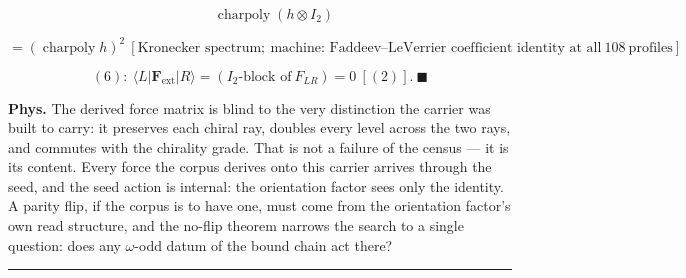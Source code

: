 \begin{theorem}
\[
\qquad \operatorname{charpoly}(h\otimes I_2)
\]

\[
= (\operatorname{charpoly}h)^2\ [\text{Kronecker spectrum};\ \text{machine: Faddeev–LeVerrier coefficient identity at all}\ 108\ \text{profiles}]
\]

\[
(6):\ \langle L|\mathbf F_{\mathrm{ext}}|R\rangle=(I_2\text{-block of}\ F_{LR})=0\ [(2)].\ \blacksquare
\]

\textbf{Phys.} The derived force matrix is blind to the very distinction the carrier was built to carry: it preserves each chiral ray, doubles every level across the two rays, and commutes with the chirality grade. That is not a failure of the census — it is its content. Every force the corpus derives onto this carrier arrives through the seed, and the seed action is internal: the orientation factor sees only the identity. A parity flip, if the corpus is to have one, must come from the orientation factor's own read structure, and the no-flip theorem narrows the search to a single question: does any $\omega$-odd datum of the bound chain act there?

\vspace{2pt}\noindent\rule{\textwidth}{0.4pt}\vspace{2pt}

\end{theorem}


